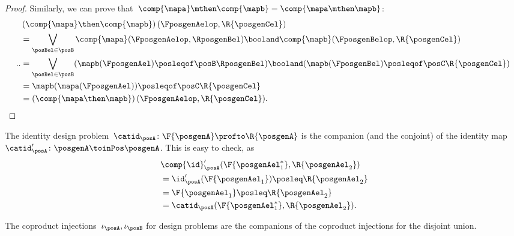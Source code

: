 \begin{proof}
    Similarly, we can prove that~$\comp{\mapa}\mthen \comp{\mapb}=\comp{\mapa\mthen \mapb}$:
    \begin{equation}
        \begin{aligned}
~&            \left(\comp{\mapa}\then \comp{\mapb}\right)(\FposgenAelop,\R{\posgenCel}) \\
& =\bigvee_{\posBel\in \posB} \comp{\mapa}(\FposgenAelop,\RposgenBel)\booland\comp{\mapb}(\FposgenBelop,\R{\posgenCel})                \\%
            ..
                                                                                      & =\bigvee_{\posBel\in \posB} (\mapb(\FposgenAel)\posleqof\posB \RposgenBel)\booland (\mapb(\FposgenBel)\posleqof\posC \R{\posgenCel}) \\
                                                                                      & =\mapb(\mapa(\FposgenAel))\posleqof\posC \R{\posgenCel}                                                                              \\
                                                                                      & =\left(\comp{\mapa\then \mapb}\right)(\FposgenAelop,\R{\posgenCel}).
        \end{aligned}
    \end{equation}
\end{proof}

\begin{example}
    The identity design problem~$\catid_\posA\colon \F{\posgenA} \profto \R{\posgenA}$ is the companion (and the conjoint) of the identity map~$\catid_\posA'\colon \posgenA \toinPos \posgenA$.
    This is easy to check, as
    \begin{equation}
        \begin{aligned}
            ~&\comp{\id}_\posA'(\F{\posgenAel_1^*},\R{\posgenAel_2}) \\
            & =\id_\posA'(\F{\posgenAel_1})\posleq \R{\posgenAel_2} \\
                                                                   & =\F{\posgenAel_1}\posleq \R{\posgenAel_2}             \\
                                                                   & =\catid_\posA(\F{\posgenAel_1^*},\R{\posgenAel_2}).
        \end{aligned}
    \end{equation}
\end{example}

\begin{example}
    The coproduct injections~$\iota_\posA, \iota_\posB$ for design problems are the companions of the coproduct injections for the disjoint union.
\end{example}

